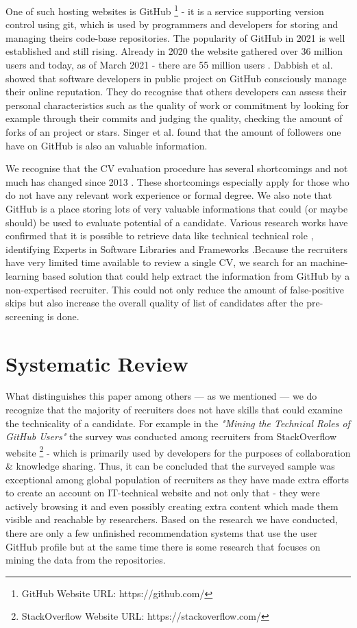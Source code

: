 \documentclass[graybox]{svmult}
\begin{document}
One of such hosting websites is GitHub \footnote{GitHub Website URL: https://github.com/} - it is a service supporting version control using git, which is used by programmers and developers for storing and managing theirs code-base repositories. The popularity of GitHub in 2021 is well established and still rising. Already in 2020 the website gathered over 36 million users \cite{GitHubUsers2020} and today, as of March 2021 - there are 55 million users \cite{GitHubUsers2021}. Dabbish et al. \cite{DabbishC} showed that software developers in public project on GitHub consciously manage their online reputation. They do recognise that others developers can assess their personal characteristics such as the quality of work or commitment by looking for example through their commits and judging the quality, checking the amount of forks of an project or stars. Singer et al. \cite{Singer} found that the amount of followers one have on GitHub is also an valuable information.

We recognise that the CV evaluation procedure has several shortcomings and not much has changed since 2013 \cite{Capiluppi}. These shortcomings especially apply for those who do not have any relevant work experience or formal degree. We also note that GitHub is a place storing lots of very valuable informations that could (or maybe should) be used to evaluate potential of a candidate. Various research works have confirmed that it is possible to retrieve data like technical technical role \cite{TechnicalRole}, identifying Experts in Software Libraries and Frameworks \cite{SoftwareLibraries} .Because the recruiters have very limited time available to review a single CV, we search for an machine-learning based solution that could help extract the information from GitHub by a non-expertised recruiter. This could not only reduce the amount of false-positive skips but also increase the overall quality of list of candidates after the pre-screening is done. 

\section{Systematic Review}

What distinguishes this paper among others — as we mentioned — we do recognize that the majority of recruiters does not have skills that could examine the technicality of a candidate. For example in the \emph{"Mining the Technical Roles of GitHub Users"} the survey was conducted among recruiters from StackOverflow website \footnote{StackOverflow Website URL: https://stackoverflow.com/} - which is primarily used by developers for the purposes of collaboration \& knowledge sharing. Thus, it can be concluded that the surveyed sample was exceptional among global population of recruiters as they have made extra efforts to create an account on IT-technical website and not only that - they were actively browsing it and even possibly creating extra content which made them visible and reachable by researchers. Based on the research we have conducted, there are only a few unfinished recommendation systems that use the user GitHub profile but at the same time there is some research that focuses on mining the data from the repositories.
\end{document}
